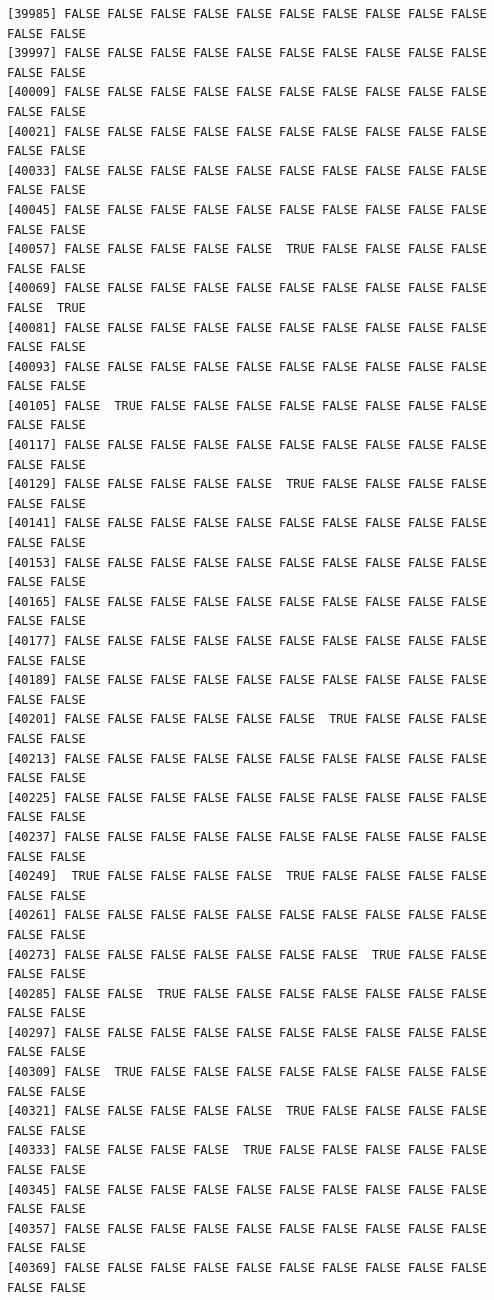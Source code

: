 \documentclass[
  a4paper,
  DIV=11,
  numbers=noendperiod]{scrartcl}
\begin{document}
\begin{verbatim}
[39985] FALSE FALSE FALSE FALSE FALSE FALSE FALSE FALSE FALSE FALSE FALSE FALSE
[39997] FALSE FALSE FALSE FALSE FALSE FALSE FALSE FALSE FALSE FALSE FALSE FALSE
[40009] FALSE FALSE FALSE FALSE FALSE FALSE FALSE FALSE FALSE FALSE FALSE FALSE
[40021] FALSE FALSE FALSE FALSE FALSE FALSE FALSE FALSE FALSE FALSE FALSE FALSE
[40033] FALSE FALSE FALSE FALSE FALSE FALSE FALSE FALSE FALSE FALSE FALSE FALSE
[40045] FALSE FALSE FALSE FALSE FALSE FALSE FALSE FALSE FALSE FALSE FALSE FALSE
[40057] FALSE FALSE FALSE FALSE FALSE  TRUE FALSE FALSE FALSE FALSE FALSE FALSE
[40069] FALSE FALSE FALSE FALSE FALSE FALSE FALSE FALSE FALSE FALSE FALSE  TRUE
[40081] FALSE FALSE FALSE FALSE FALSE FALSE FALSE FALSE FALSE FALSE FALSE FALSE
[40093] FALSE FALSE FALSE FALSE FALSE FALSE FALSE FALSE FALSE FALSE FALSE FALSE
[40105] FALSE  TRUE FALSE FALSE FALSE FALSE FALSE FALSE FALSE FALSE FALSE FALSE
[40117] FALSE FALSE FALSE FALSE FALSE FALSE FALSE FALSE FALSE FALSE FALSE FALSE
[40129] FALSE FALSE FALSE FALSE FALSE  TRUE FALSE FALSE FALSE FALSE FALSE FALSE
[40141] FALSE FALSE FALSE FALSE FALSE FALSE FALSE FALSE FALSE FALSE FALSE FALSE
[40153] FALSE FALSE FALSE FALSE FALSE FALSE FALSE FALSE FALSE FALSE FALSE FALSE
[40165] FALSE FALSE FALSE FALSE FALSE FALSE FALSE FALSE FALSE FALSE FALSE FALSE
[40177] FALSE FALSE FALSE FALSE FALSE FALSE FALSE FALSE FALSE FALSE FALSE FALSE
[40189] FALSE FALSE FALSE FALSE FALSE FALSE FALSE FALSE FALSE FALSE FALSE FALSE
[40201] FALSE FALSE FALSE FALSE FALSE FALSE  TRUE FALSE FALSE FALSE FALSE FALSE
[40213] FALSE FALSE FALSE FALSE FALSE FALSE FALSE FALSE FALSE FALSE FALSE FALSE
[40225] FALSE FALSE FALSE FALSE FALSE FALSE FALSE FALSE FALSE FALSE FALSE FALSE
[40237] FALSE FALSE FALSE FALSE FALSE FALSE FALSE FALSE FALSE FALSE FALSE FALSE
[40249]  TRUE FALSE FALSE FALSE FALSE  TRUE FALSE FALSE FALSE FALSE FALSE FALSE
[40261] FALSE FALSE FALSE FALSE FALSE FALSE FALSE FALSE FALSE FALSE FALSE FALSE
[40273] FALSE FALSE FALSE FALSE FALSE FALSE FALSE  TRUE FALSE FALSE FALSE FALSE
[40285] FALSE FALSE  TRUE FALSE FALSE FALSE FALSE FALSE FALSE FALSE FALSE FALSE
[40297] FALSE FALSE FALSE FALSE FALSE FALSE FALSE FALSE FALSE FALSE FALSE FALSE
[40309] FALSE  TRUE FALSE FALSE FALSE FALSE FALSE FALSE FALSE FALSE FALSE FALSE
[40321] FALSE FALSE FALSE FALSE FALSE  TRUE FALSE FALSE FALSE FALSE FALSE FALSE
[40333] FALSE FALSE FALSE FALSE  TRUE FALSE FALSE FALSE FALSE FALSE FALSE FALSE
[40345] FALSE FALSE FALSE FALSE FALSE FALSE FALSE FALSE FALSE FALSE FALSE FALSE
[40357] FALSE FALSE FALSE FALSE FALSE FALSE FALSE FALSE FALSE FALSE FALSE FALSE
[40369] FALSE FALSE FALSE FALSE FALSE FALSE FALSE FALSE FALSE FALSE FALSE FALSE

\end{verbatim}
\end{document}

